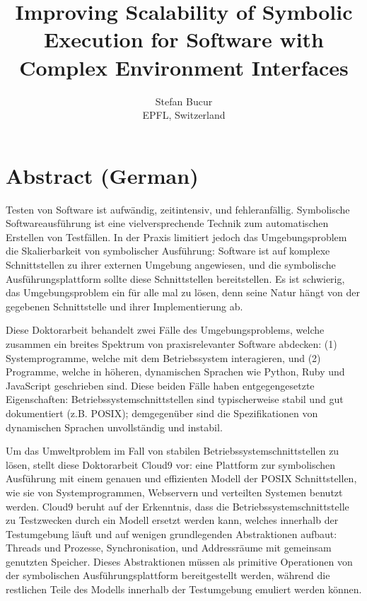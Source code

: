 \documentclass[letterpaper,10pt,oneside]{book}
\newcommand{\thesistitle}{Improving Scalability of Symbolic Execution for Software with Complex Environment Interfaces}
\begin{document}
\date{}
\title{\thesistitle}
\author{Stefan Bucur \\ EPFL, Switzerland}

\maketitle

\chapter*{Abstract (German)}

Testen von Software ist aufwändig, zeitintensiv, und fehleranfällig. Symbolische Softwareausführung ist eine vielversprechende Technik zum automatischen Erstellen von Testfällen. In der Praxis limitiert jedoch das Umgebungsproblem die Skalierbarkeit von symbolischer Ausführung: Software ist auf komplexe Schnittstellen zu ihrer externen Umgebung angewiesen, und die symbolische Ausführungsplattform sollte diese Schnittstellen bereitstellen. Es ist schwierig, das Umgebungsproblem ein für alle mal zu lösen, denn seine Natur hängt von der gegebenen Schnittstelle und ihrer Implementierung ab.

Diese Doktorarbeit behandelt zwei Fälle des Umgebungsproblems, welche zusammen ein breites Spektrum von praxisrelevanter Software abdecken: (1) Systemprogramme, welche mit dem Betriebssystem interagieren, und (2) Programme, welche in höheren, dynamischen Sprachen wie Python, Ruby und JavaScript geschrieben sind. Diese beiden Fälle haben entgegengesetzte Eigenschaften: Betriebssystemschnittstellen sind typischerweise stabil und gut dokumentiert (z.B. POSIX); demgegenüber sind die Spezifikationen von dynamischen Sprachen unvollständig und instabil.

Um das Umweltproblem im Fall von stabilen Betriebssystemschnittstellen zu lösen, stellt diese Doktorarbeit Cloud9 vor: eine Plattform zur symbolischen Ausführung mit einem genauen und effizienten Modell der POSIX Schnittstellen, wie sie von Systemprogrammen, Webservern und verteilten Systemen benutzt werden. Cloud9 beruht auf der Erkenntnis, dass die Betriebssystemschnittstelle zu Testzwecken durch ein Modell ersetzt werden kann, welches innerhalb der Testumgebung läuft und auf wenigen grundlegenden Abstraktionen aufbaut: Threads und Prozesse, Synchronisation, und Addressräume mit gemeinsam genutzten Speicher. Dieses Abstraktionen müssen als primitive Operationen von der symbolischen Ausführungsplattform bereitgestellt werden, während die restlichen Teile des Modells innerhalb der Testumgebung emuliert werden können.
\end{document}

